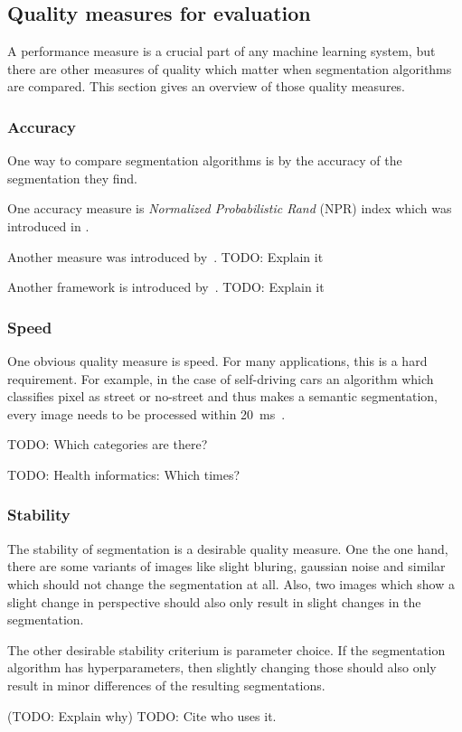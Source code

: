 \subsection{Quality measures for evaluation}\label{subsec:quality-measures}

A performance measure is a crucial part of any machine learning system, but
there are other measures of quality which matter when segmentation algorithms
are compared. This section gives an overview of those quality measures.


\subsubsection{Accuracy}
One way to compare segmentation algorithms is by the accuracy of the
segmentation they find.

One accuracy measure is \textit{Normalized Probabilistic Rand} (NPR) index
which was introduced in \cite{unnikrishnan2005measure}.

Another measure was introduced by~\cite{celebi2009improved}. TODO: Explain it

Another framework is introduced by~\cite{jaber2010probabilistic}. TODO: Explain
it

\subsubsection{Speed}\label{subsubsec:speed-quality-measure}
One obvious quality measure is speed. For many applications, this is a hard
requirement. For example, in the case of self-driving cars an algorithm which
classifies pixel as street or no-street and thus makes a semantic segmentation,
every image needs to be processed within
\SI{20}{\milli\second}~\cite{bittel2015pixel}.

TODO: Which categories are there?

TODO: Health informatics: Which times?


\subsubsection{Stability}\label{subsubsec:stability-quality-measure}
The stability of segmentation is a desirable quality measure. One the one hand,
there are some variants of images like slight bluring, gaussian noise and
similar which should not change the segmentation at all. Also, two images which
show a slight change in perspective should also only result in slight changes
in the segmentation.

The other desirable stability criterium is parameter choice. If the
segmentation algorithm has hyperparameters, then slightly changing those should
also only result in minor differences of the resulting segmentations.

(TODO: Explain why)
TODO: Cite who uses it.
